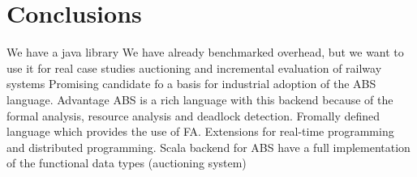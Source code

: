 \section{Conclusions}
We have a java library
We have already benchmarked overhead, but we want to use it for real case studies auctioning and incremental evaluation of railway systems
Promising candidate fo a basis for industrial adoption of the ABS language.
Advantage 
ABS is a rich language with this backend because of the formal analysis, resource analysis and deadlock detection.
Fromally defined language which provides the use of FA. 
Extensions for real-time programming and distributed programming.  
Scala backend for ABS have a full implementation of the functional data types (auctioning system)